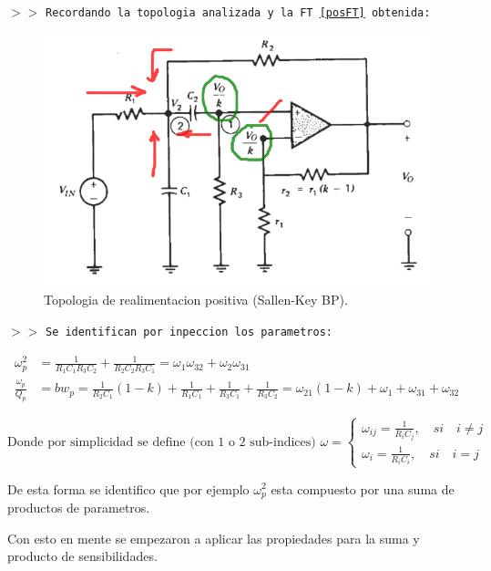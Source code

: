 \noindent $>>$ \texttt{Recordando la topologia analizada y la FT \eqref{posFT} obtenida:}

\begin{figure}[H]
    \centering
    \includegraphics[scale=.5]{Secciones/Circ1/img/sallenKeyBP.png}
    \caption{Topologia de realimentacion positiva (Sallen-Key BP).}
    \label{c1}
\end{figure}

\noindent $>>$ \texttt{Se identifican por inpeccion los parametros:}

\begin{align*}
    \omega_p^{2} &= \frac{1}{R_{1} C_{1} R_{3} C_{2}} + \frac{1}{R_{2} C_{2} R_{3} C_{1}}
    = \omega_{1} \omega_{32} + \omega_{2} \omega_{31}  \\ 
    \frac{\omega_{p}}{Q_{p}} &= bw_p 
    = \frac{1}{R_{2} C_{1}} (1-k) + \frac{1}{R_{1} C_{1}} + \frac{1}{R_{3} C_{1}} + \frac{1}{R_{3} C_{2}} 
    = \omega_{21} (1-k) + \omega_{1} + \omega_{31} + \omega_{32}
\end{align*}

$$
\text{Donde por simplicidad se define (con 1 o 2 sub-indices) }
\omega=\begin{cases}
            \omega_{ij}=\frac{1}{R_{i} C_{j}}, \quad si \quad i\neq j \\
            \omega_{i}=\frac{1}{R_{i} C_{i}}, \quad si\quad i=j
        \end{cases}
$$

De esta forma se identifico que por ejemplo $\omega_{p}^{2}$ esta compuesto por una suma de productos de parametros.

Con esto en mente se empezaron a aplicar las propiedades para la suma y producto de sensibilidades.

